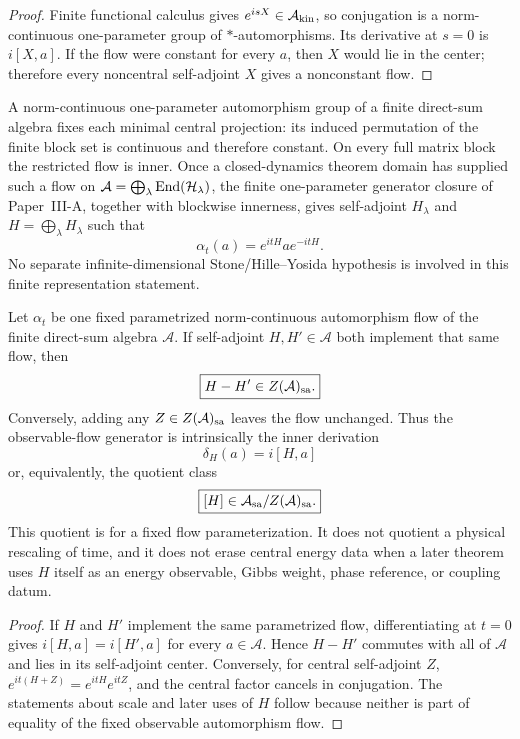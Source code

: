 \documentclass[12pt,a4paper]{article}
\begin{document}
\begin{proof}
Finite functional calculus gives \(e^{isX}\in\mathcal A_{\rm kin}\), so
conjugation is a norm-continuous one-parameter group of
\(*\)-automorphisms.  Its derivative at \(s=0\) is \(i[X,a]\).  If the flow
were constant for every \(a\), then \(X\) would lie in the center; therefore
every noncentral self-adjoint \(X\) gives a nonconstant flow.
\end{proof}

A norm-continuous one-parameter automorphism group of a finite direct-sum
algebra fixes each minimal central projection: its induced permutation of the
finite block set is continuous and therefore constant.  On every full matrix
block the restricted flow is inner.  Once a closed-dynamics theorem
domain has supplied such a flow on
\(\mathcal A=\bigoplus_\lambda\operatorname{End}(\mathcal H_\lambda)\), the finite
one-parameter generator closure of Paper~III-A, together with blockwise
innerness, gives self-adjoint \(H_\lambda\) and
\(H=\bigoplus_\lambda H_\lambda\) such that
\begin{equation}
\label{p4:eq:heisenberg-flow}
\alpha_t(a)=e^{itH}ae^{-itH}.
\end{equation}
No separate infinite-dimensional Stone/Hille--Yosida hypothesis is involved
in this finite representation statement.

\begin{corollary}
\label{p4:cor:central-gauge-closed-generator}
Let \(\alpha_t\) be one fixed parametrized norm-continuous automorphism flow
of the finite direct-sum algebra \(\mathcal A\).  If self-adjoint
\(H,H'\in\mathcal A\) both implement that same flow, then
\[
 \boxed{H-H'\in Z(\mathcal A)_{\rm sa}.}
\]
Conversely, adding any \(Z\in Z(\mathcal A)_{\rm sa}\) leaves the flow
unchanged.  Thus the observable-flow generator is intrinsically the inner
derivation
\[
 \delta_H(a)=i[H,a]
\]
or, equivalently, the quotient class
\[
 \boxed{[H]\in \mathcal A_{\rm sa}/Z(\mathcal A)_{\rm sa}.}
\]
This quotient is for a fixed flow parameterization.  It does not quotient a
physical rescaling of time, and it does not erase central energy data when a
later theorem uses \(H\) itself as an energy observable, Gibbs weight, phase
reference, or coupling datum.
\end{corollary}

\begin{proof}
If \(H\) and \(H'\) implement the same parametrized flow, differentiating at
\(t=0\) gives \(i[H,a]=i[H',a]\) for every \(a\in\mathcal A\).  Hence
\(H-H'\) commutes with all of \(\mathcal A\) and lies in its self-adjoint
center.  Conversely, for central self-adjoint \(Z\),
\(e^{it(H+Z)}=e^{itH}e^{itZ}\), and the central factor cancels in conjugation.
The statements about scale and later uses of \(H\) follow because neither is
part of equality of the fixed observable automorphism flow.
\end{proof}
\end{document}
